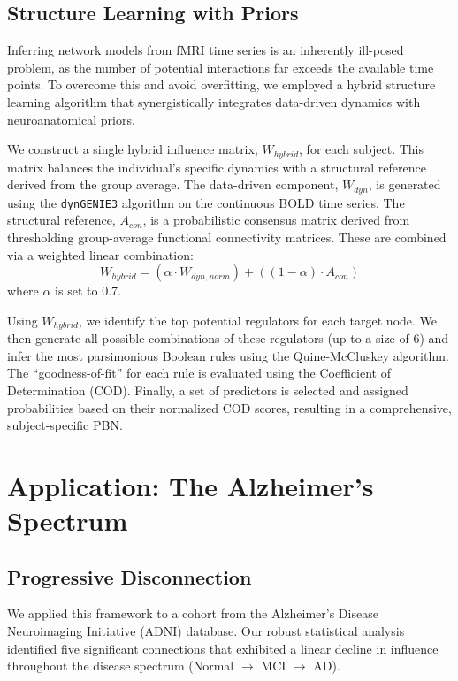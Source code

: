 \documentclass[12pt, a4paper]{report}
\begin{document}
\subsection{Structure Learning with Priors}
Inferring network models from fMRI time series is an inherently ill-posed problem, as the number of potential interactions far exceeds the available time points. To overcome this and avoid overfitting, we employed a hybrid structure learning algorithm that synergistically integrates data-driven dynamics with neuroanatomical priors.

We construct a single hybrid influence matrix, $W_{hybrid}$, for each subject. This matrix balances the individual's specific dynamics with a structural reference derived from the group average. The data-driven component, $W_{dyn}$, is generated using the \texttt{dynGENIE3} algorithm on the continuous BOLD time series. The structural reference, $A_{con}$, is a probabilistic consensus matrix derived from thresholding group-average functional connectivity matrices. These are combined via a weighted linear combination:
\begin{equation}
	W_{hybrid} = (\alpha \cdot W_{dyn,norm}) + ((1 - \alpha) \cdot A_{con})
\end{equation}
where $\alpha$ is set to 0.7.

Using $W_{hybrid}$, we identify the top potential regulators for each target node. We then generate all possible combinations of these regulators (up to a size of 6) and infer the most parsimonious Boolean rules using the Quine-McCluskey algorithm. The ``goodness-of-fit'' for each rule is evaluated using the Coefficient of Determination (COD). Finally, a set of predictors is selected and assigned probabilities based on their normalized COD scores, resulting in a comprehensive, subject-specific PBN.

\section{Application: The Alzheimer's Spectrum}

\subsection{Progressive Disconnection}
We applied this framework to a cohort from the Alzheimer's Disease Neuroimaging Initiative (ADNI) database. Our robust statistical analysis identified five significant connections that exhibited a linear decline in influence throughout the disease spectrum (Normal $\to$ MCI $\to$ AD).
\end{document}
